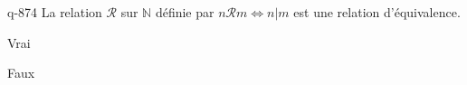 \begin{truefalse}{q-874}
La relation $\mathcal R$ sur $\mathbb N$ définie par $n\mathcal R m \iff n|m$ est une relation d'équivalence.
\item Vrai
\item* Faux
\end{truefalse}

